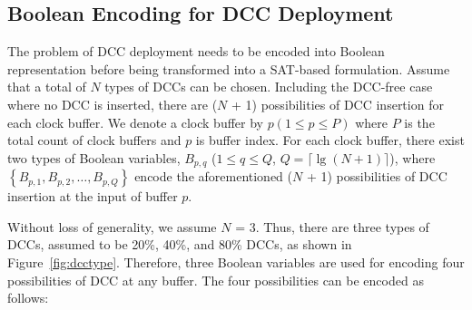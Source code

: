 
\subsection{Boolean Encoding for DCC Deployment}
\label{subsec:eddcd}
The problem of DCC deployment needs to be encoded into Boolean representation before being transformed into a SAT-based formulation. Assume that a total of $N$ types of DCCs can be chosen. Including the DCC-free case where no DCC is inserted, there are ($N$ + 1) possibilities of DCC insertion for each clock buffer. We denote a clock buffer by $p\left(1 \leq p \leq P\right)$ where $P$ is the total count of clock buffers and $p$ is buffer index. For each clock buffer, there exist two types of Boolean variables, $B_{p,q}$ ($1 \leq q \leq Q $, $Q = \lceil \lg (N + 1)\rceil$), where $\left\{B_{p,1}, B_{p,2},\dotsc, B_{p,Q}\right\}$ encode the aforementioned ($N$ + 1) possibilities of DCC insertion at the input of buffer $p$.



Without loss of generality, we assume $N$ = 3. Thus, there are three types of DCCs, assumed to be 20\%, 40\%, and 80\% DCCs, as shown in Figure~\ref{fig:dcctype}. Therefore, three Boolean variables are used for encoding four possibilities of DCC at any buffer. The four possibilities can be encoded as follows:

